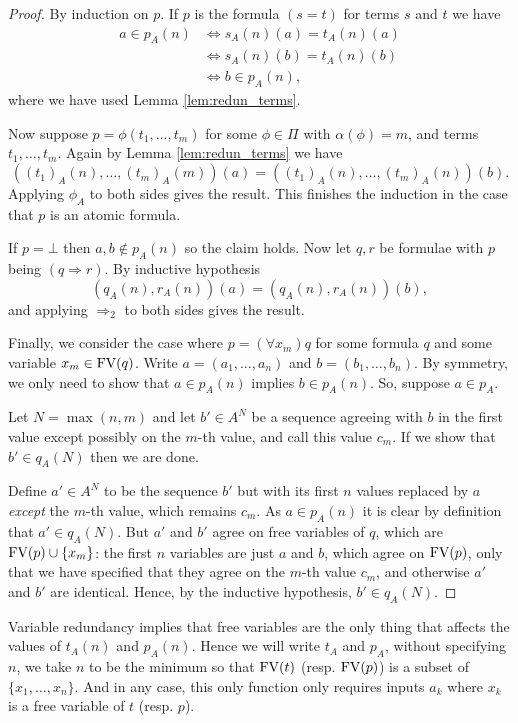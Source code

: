 \documentclass{report}
\theoremstyle{definition}
\theoremstyle{plain}
\theoremstyle{definition}
\begin{document}
	\begin{proof}
		By induction on $p$. If $p$ is the formula $(s=t)$ for terms $s$ and $t$ we have
		\begin{align*}
			a\in p_A(n) &\iff s_A(n)(a) = t_A(n)(a)\\
			&\iff s_A(n)(b) = t_A(n)(b)\\
			&\iff b\in p_A(n),
		\end{align*}
		where we have used Lemma \ref{lem:redun_terms}.
		
		Now suppose $p = \phi (t_1,\ldots,t_m)$ for some $\phi \in \Pi$ with $\alpha(\phi) = m$, and terms $t_1,\ldots, t_m$. Again by Lemma \ref{lem:redun_terms} we have
		\[
		((t_1)_A(n),\ldots, (t_m)_A(m))(a) = ((t_1)_A(n),\ldots, (t_m)_A(n))(b).
		\]
		Applying $\phi_A$ to both sides gives the result. This finishes the induction in the case that $p$ is an atomic formula.
		
		If $p = \bot$ then $a,b\notin p_A(n)$ so the claim holds. Now let $q,r$ be formulae with $p$ being $(q\Rightarrow r)$. By inductive hypothesis
		\[
		(q_A(n),r_A(n))(a) = (q_A(n),r_A(n))(b),
		\]
		and applying $\Rightarrow_2$ to both sides gives the result.
		
		Finally, we consider the case where $p = (\forall x_m)q$ for some formula $q$ and some variable $x_m\in \textnormal{FV}(q)$. Write $a = (a_1,\ldots,a_n)$ and $b= (b_1,\ldots,b_n)$. By symmetry, we only need to show that $a\in p_A(n)$ implies $b\in p_A(n)$. So, suppose $a \in p_A$. 
		
		Let $N= \max(n,m)$ and let $b'\in A^N$ be a sequence agreeing with $b$ in the first value except possibly on the $m$-th value, and call this value $c_m$. If we show that $b' \in q_A(N)$ then we are done.
		
		Define $a'\in A^N$ to be the sequence $b'$ but with its first $n$ values replaced by $a$ \emph{except} the $m$-th value, which remains $c_m$. As $a\in p_A(n)$ it is clear by definition that $a'\in q_A(N)$. But $a'$ and $b'$ agree on free variables of $q$, which are $\textnormal{FV}(p)\cup\{x_m\}$: the first $n$ variables are just $a$ and $b$, which agree on $\textnormal{FV}(p)$, only that we have specified that they agree on the $m$-th value $c_m$, and otherwise $a'$ and $b'$ are identical. Hence, by the inductive hypothesis, $b'\in q_A(N)$.
	\end{proof}
	Variable redundancy implies that free variables are the only thing that affects the values of $t_A(n)$ and $p_A(n)$. Hence we will write $t_A$ and $p_A$, without specifying $n$, we take $n$ to be the minimum so that $\textnormal{FV}(t)$ (resp. $\textnormal{FV}(p)$) is a subset of $\{x_1,\ldots,x_n\}$. And in any case, this only function only requires inputs $a_k$ where $x_k$ is a free variable of $t$ (resp. $p$).
\end{document}
